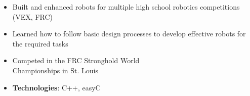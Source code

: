 \documentclass[10pt, letterpaper, ragged2e, withhyper]{altacv}
\begin{document}
\begin{paracol}{2}
    \divider

    \begin{itemize}
        \item Built and enhanced robots for multiple high school robotics competitions (VEX, FRC)
        \item Learned how to follow basic design processes to develop effective robots for the required tasks
        \item Competed in the FRC Stronghold World\\ Championships in St. Louis 
        \item \textbf{Technologies}: C++, easyC 
    \end{itemize}
     
    \divider


\end{paracol}
\end{document}
